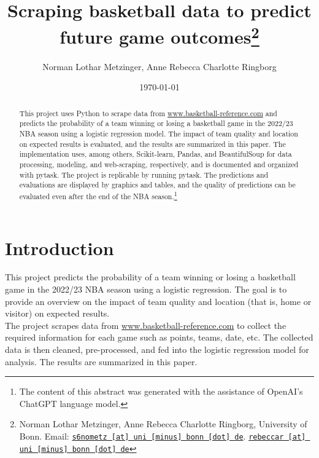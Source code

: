 \documentclass[11pt, a4paper, leqno]{article}
\begin{document}
\title{Scraping basketball data to predict future game outcomes\thanks{Norman Lothar Metzinger, Anne Rebecca Charlotte Ringborg, University of Bonn. Email:
\href{mailto:s6nometz@uni-bonn.de}{\nolinkurl{s6nometz [at] uni [minus] bonn [dot] de}}. \href{mailto:rebeccar@uni-bonn.de}{\nolinkurl{rebeccar [at] uni [minus] bonn [dot] de}}}}

\author{Norman Lothar Metzinger, Anne Rebecca Charlotte Ringborg}

\date{
    \today
}

\maketitle


\begin{abstract}
    This project uses Python to scrape data from \href{www.basketball-reference.com}{www.basketball-reference.com} and predicts the probability of a team winning or losing a basketball game in the 2022/23 NBA season using a logistic regression model.
    The impact of team quality and location on expected results is evaluated, and the results are summarized in this paper.
    The implementation uses, among others, Scikit-learn, Pandas, and BeautifulSoup for data processing, modeling, and web-scraping, respectively, and is documented and organized with pytask.
    The project is replicable by running pytask. The predictions and evaluations are displayed by graphics and tables, and the quality of predictions can be evaluated even after the end of the NBA season.\footnote{The content of this abstract was generated with the assistance of OpenAI's ChatGPT language model.}
\end{abstract}

\clearpage


\section{Introduction}
\label{sec:introduction}

This project predicts the probability of a team winning or losing a basketball game in the 2022/23 NBA season using a logistic regression. The goal is to provide an overview on the impact of team quality and location (that is, home or visitor) on expected results.\\

The project scrapes data from \href{www.basketball-reference.com}{www.basketball-reference.com} to collect the required information for each game such as points, teams, date, etc.
The collected data is then cleaned, pre-processed, and fed into the logistic regression model for analysis. The results are summarized in this paper.\\
\end{document}
